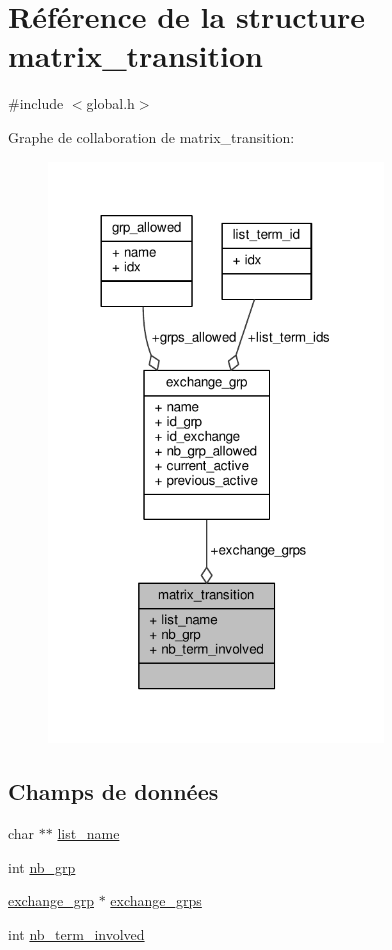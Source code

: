 \hypertarget{structmatrix__transition}{\section{Référence de la structure matrix\+\_\+transition}
\label{structmatrix__transition}
}


{\ttfamily \#include $<$global.\+h$>$}



Graphe de collaboration de matrix\+\_\+transition\+:\nopagebreak
\begin{figure}[H]
\begin{center}
\leavevmode
\includegraphics[width=252pt]{structmatrix__transition__coll__graph}
\end{center}
\end{figure}
\subsection*{Champs de données}
\begin{DoxyCompactItemize}
\item 
char $\ast$$\ast$ \hyperlink{structmatrix__transition_a3840718ccc94af35ad32de5a316336e7}{list\+\_\+name}
\item 
int \hyperlink{structmatrix__transition_aa62d9919664f603000d1ee218fed0fa9}{nb\+\_\+grp}
\item 
\hyperlink{structexchange__grp}{exchange\+\_\+grp} $\ast$ \hyperlink{structmatrix__transition_ad09abbe408a97387843ccd48e8358f7c}{exchange\+\_\+grps}
\item 
int \hyperlink{structmatrix__transition_a437f19111dafafa7077ae791daa2cf0e}{nb\+\_\+term\+\_\+involved}
\end{DoxyCompactItemize}


